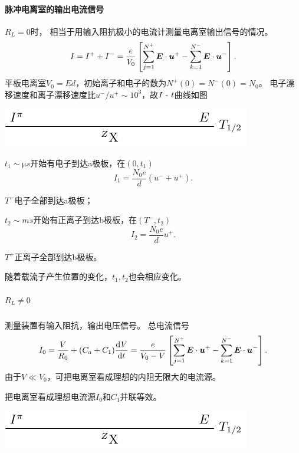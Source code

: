 \paragraph{脉冲电离室的输出电流信号}$R_L=0$时，
相当于用输入阻抗极小的电流计测量电离室输出信号的情况。%
\[
	I=I^++I^-=\frac e{V_0}\left[\sum_{j=1}^{N^+}\bm E\cdot\bm u^+-\sum_{k=1}^{N^-}\bm E\cdot\bm u^-\right].
\]
平板电离室$V_0=Ed$，初始离子和电子的数为$N^+(0)=N^-(0)=N_0$。
电子漂移速度和离子漂移速度比$u^-/u^+\sim 10^3$，故$I~\text{-}~ t$曲线如图
\begin{center}
	\includegraphics[page=16]{figures/tikz/layouts.pdf}
\end{center}
\begin{compactenum}
	\item $t_1\sim\si{\micro s}$开始有电子到达a极板，在$(0,t_1)$
	\[
		I_1=\frac{N_0e}d(u^-+u^+).
	\]
	\item $T^-$电子全部到达a极板；
	\item $t_2\sim\si{ms}$开始有正离子到达b极板，在$(T^-,t_2)$
	\[
		I_2=\frac{N_0e}du^+.
	\]
	\item $T^+$正离子全部到达b极板。
\end{compactenum}
随着载流子产生位置的变化，$t_1,t_2$也会相应变化。
\subparagraph{$R_L\neq 0$}
测量装置有输入阻抗，输出电压信号。
总电流信号
\[
	I_0=\frac V{R_0}+(C_a+C_1)\frac{\mathrm{d}^{{}}V}{\mathrm{d}{t}^{{}}}=\frac e{V_0-V}\left[\sum_{j=1}^{N^+}\bm E\cdot\bm u^+-\sum_{k=1}^{N^-}\bm E\cdot\bm u^-\right].
\]
由于$V\ll V_0$，可把电离室看成理想的内阻无限大的电流源。

把电离室看成理想电流源$I_0$和$C_1$并联等效。
\begin{center}
	\includegraphics[page=17]{figures/tikz/layouts.pdf}
\end{center}
